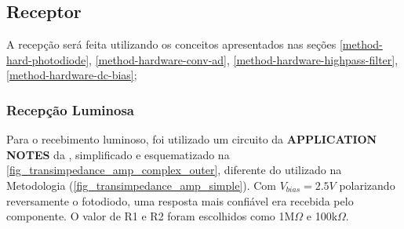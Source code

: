 	\subsection{Receptor}
	
	A recepção será feita utilizando os conceitos apresentados nas seções \ref{method-hard-photodiode}, \ref{method-hardware-conv-ad}, \ref{method-hardware-highpass-filter}, \ref{method-hardware-dc-bias};
	
	\subsubsection{Recepção Luminosa}
	Para o recebimento luminoso, foi utilizado um circuito da \textbf{APPLICATION NOTES} da \cite{datasheet-opa380}, simplificado e esquematizado na \autoref{fig_transimpedance_amp_complex_outer}, diferente do utilizado na Metodologia (\autoref{fig_transimpedance_amp_simple}). Com $V_{bias} = 2.5V$ polarizando reversamente o fotodiodo, uma resposta mais confiável era recebida pelo componente. O valor de R1 e R2 foram  escolhidos como 1M$\Omega$ e 100k$\Omega$.
	
